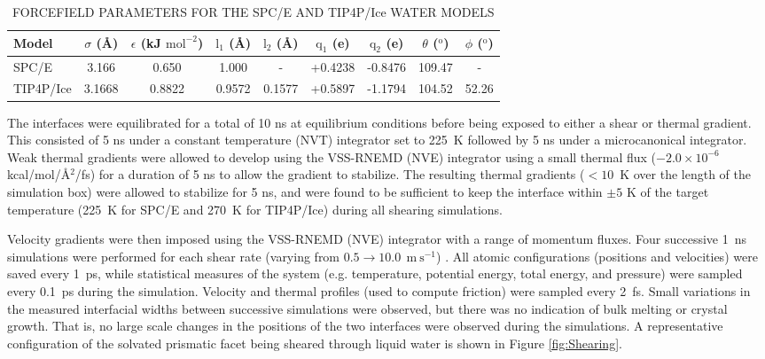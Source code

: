 \begin{table}
\centering
\caption{FORCEFIELD PARAMETERS FOR THE SPC/E AND TIP4P/Ice WATER MODELS}
\label{tab:waterModels}
\begin{tabular}{l|c|c|c|c|c|c|c|c} 
\hline
\hline
  Model &  $\sigma$ (\AA) & $\epsilon$ (kJ $\mathrm{mol}^{-2}$) &
                                                              $\mathrm{l}_{1}$
                                                              (\AA) &
                                                                    $\mathrm{l}_{2}$
                                                                      (\AA)
  & $\mathrm{q}_{1}$ (e) & $\mathrm{q}_{2}$ (e) & $\theta$
                                                  ($^{\mathrm{o}}$) &
                                                                      $\phi$ ($^{\mathrm{o}}$) \\ \hline
  SPC/E & 3.166 & 0.650 & 1.000 & - & +0.4238 & -0.8476 & 109.47 & - \\
  TIP4P/Ice & 3.1668 & 0.8822 & 0.9572 & 0.1577 & +0.5897 & -1.1794 &
  104.52 & 52.26 \\
\hline
\hline
\end{tabular}
\end {table}


The interfaces were equilibrated for a total of 10 ns at equilibrium
conditions before being exposed to either a shear or thermal gradient.
This consisted of 5 ns under a constant temperature (NVT) integrator
set to 225~K followed by 5 ns under a microcanonical integrator.  Weak
thermal gradients were allowed to develop using the VSS-RNEMD (NVE)
integrator using a small thermal flux ($-2.0\times 10^{-6}$
kcal/mol/\AA$^2$/fs) for a duration of 5 ns to allow the gradient to
stabilize.  The resulting thermal gradients ($< 10$~K over the length
of the simulation box) were allowed to stabilize for 5 ns, and were
found to be sufficient to keep the interface within $\pm 5$ K of the
target temperature (225~K for SPC/E and 270~K for TIP4P/Ice) during
all shearing simulations.

Velocity gradients were then imposed using the VSS-RNEMD (NVE)
integrator with a range of momentum fluxes.  Four successive 1~ns
simulations were performed for each shear rate (varying from
$0.5 \rightarrow 10.0~\mathrm{~m~s}^{-1}$) . All atomic configurations
(positions and velocities) were saved every 1~ps, while statistical
measures of the system (e.g. temperature, potential energy, total
energy, and pressure) were sampled every 0.1~ps during the
simulation. Velocity and thermal profiles (used to compute friction)
were sampled every 2~fs. Small variations in the measured interfacial
widths between successive simulations were observed, but there was no
indication of bulk melting or crystal growth. That is, no large scale
changes in the positions of the two interfaces were observed during
the simulations.  A representative configuration of the solvated
prismatic facet being sheared through liquid water is shown in Figure
\ref{fig:Shearing}.


